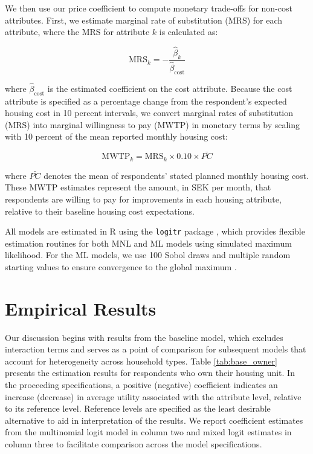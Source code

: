 \documentclass[3p,11pt ]{elsarticle}
\begin{document}
We then use our price coefficient to compute monetary trade-offs for non-cost attributes. 
First,
we estimate marginal rate of substitution (MRS) for each attribute,
where the MRS for attribute \( k \) is calculated as:

\begin{equation}
\text{MRS}_k = -\frac{\hat{\beta}_k}{\hat{\beta}_{\text{cost}}}
\label{eq:mrs}
\end{equation}

\noindent where \( \hat{\beta}_{\text{cost}} \) is the estimated coefficient on the cost attribute.
Because the cost attribute is specified as a percentage change from the respondent’s expected housing cost in 10 percent intervals, we convert marginal rates of substitution (MRS) into marginal willingness to pay (MWTP) in monetary terms by scaling with 10 percent of the mean reported monthly housing cost:

\begin{equation}
\text{MWTP}_k = \text{MRS}_k \times 0.10 \times \bar{PC}
\label{eq:mwtp}
\end{equation}

\noindent where $\bar{PC}$ denotes the mean of respondents' stated planned monthly housing cost.
These MWTP estimates represent the amount, in SEK per month, that respondents are willing to pay for improvements in each housing attribute, relative to their baseline housing cost expectations. 

All models are estimated in R using the \texttt{logitr} package \citep{helvestonLogitrFastEstimation2023}, which provides flexible estimation routines for both MNL and ML models using simulated maximum likelihood.
For the ML models,
we use 100 Sobol draws and multiple random starting values to ensure convergence to the global maximum \citep{trainDiscreteChoiceMethods2003}.




\section{Empirical Results}

Our discussion begins with results from the baseline model, which excludes interaction terms and serves as a point of comparison for subsequent models that account for heterogeneity across household types.
Table \ref{tab:base_owner} presents the estimation results for respondents who own their housing unit.
In the proceeding specifications, a positive (negative) coefficient indicates an increase (decrease) in average utility associated with the attribute level, relative to its reference level.
Reference levels are specified as the least desirable alternative to aid in interpretation of the results.
We report coefficient estimates from the multinomial logit model in column two and mixed logit estimates in column three  to facilitate comparison across the model specifications.
\end{document}
